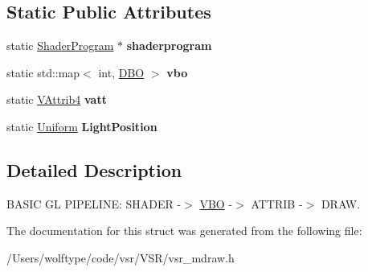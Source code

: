 \subsection*{Static Public Attributes}
\begin{DoxyCompactItemize}
\item 
\hypertarget{structvsr_1_1_g_l_1_1_draw_1_1_pipe_a59c05617e1742b951956feacf943735a}{static \hyperlink{classvsr_1_1_shader_program}{Shader\-Program} $\ast$ {\bfseries shaderprogram}}\label{structvsr_1_1_g_l_1_1_draw_1_1_pipe_a59c05617e1742b951956feacf943735a}

\item 
\hypertarget{structvsr_1_1_g_l_1_1_draw_1_1_pipe_a473d0a3d2c449446098f74df5c997e25}{static std\-::map$<$ int, \hyperlink{structvsr_1_1_d_b_o}{D\-B\-O} $>$ {\bfseries vbo}}\label{structvsr_1_1_g_l_1_1_draw_1_1_pipe_a473d0a3d2c449446098f74df5c997e25}

\item 
\hypertarget{structvsr_1_1_g_l_1_1_draw_1_1_pipe_a858e472a87d0894a5d61e9a97880d1d6}{static \hyperlink{structvsr_1_1_v_attrib4}{V\-Attrib4} {\bfseries vatt}}\label{structvsr_1_1_g_l_1_1_draw_1_1_pipe_a858e472a87d0894a5d61e9a97880d1d6}

\item 
\hypertarget{structvsr_1_1_g_l_1_1_draw_1_1_pipe_aaa74a4265451c34be7a7004ca10942d3}{static \hyperlink{structvsr_1_1_uniform}{Uniform} {\bfseries Light\-Position}}\label{structvsr_1_1_g_l_1_1_draw_1_1_pipe_aaa74a4265451c34be7a7004ca10942d3}

\end{DoxyCompactItemize}


\subsection{Detailed Description}
B\-A\-S\-I\-C G\-L P\-I\-P\-E\-L\-I\-N\-E\-: S\-H\-A\-D\-E\-R -\/$>$ \hyperlink{classvsr_1_1_v_b_o}{V\-B\-O} -\/$>$ A\-T\-T\-R\-I\-B -\/$>$ D\-R\-A\-W. 

The documentation for this struct was generated from the following file\-:\begin{DoxyCompactItemize}
\item 
/\-Users/wolftype/code/vsr/\-V\-S\-R/vsr\-\_\-mdraw.\-h\end{DoxyCompactItemize}
